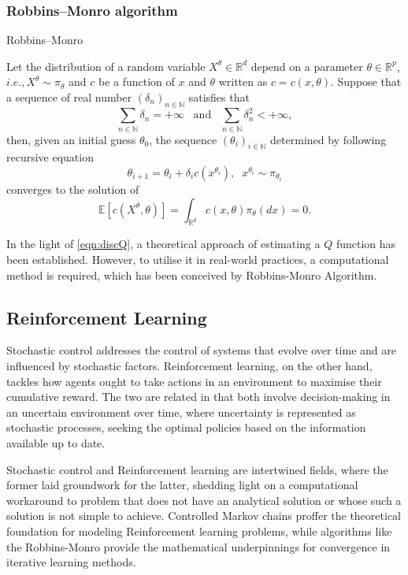 \documentclass[11pt,twoside]{article}
\numberwithin{Theorem}{section}
\numberwithin{Definition}{section}
\numberwithin{Lemma}{section}
\numberwithin{Algorithm}{section}
\numberwithin{equation}{section}
\begin{document}
\subsubsection{Robbins–Monro algorithm}
\begin{algorithm} [H] 
\caption{Robbins–Monro}\label{alg:RM}
    Let the distribution of a random variable $X^{\theta}\in\mathbb{R}^d$ depend on a parameter $\theta\in\mathbb{R}^p$, $i.e., X^{\theta}\sim\pi_{\theta}$ and $c$ be a function of $x$ and $\theta$ written as $c=c(x,\theta)$. Suppose that a sequence of real number $(\delta_n)_{n\in\mathbb{N}}$ satisfies that
\begin{equation}\label{eqn:req}
\sum_{n\in\mathbb{N}}\delta_n=+\infty\;\;\;\text{and}\;\;\;\sum_{n\in\mathbb{N}}\delta_n^2<+\infty,
\end{equation}
then, given an initial guess $\theta_0$, the sequence $(\theta_i)_{i\in\mathbb{N}}$ determined by following recursive equation
$$\theta_{i+1}=\theta_{i}+\delta_i c(x^{\theta_i}), \;\;x^{\theta_i}\sim\pi_{\theta_i}$$
converges to the solution of 
$$\mathbb{E}\left[c(X^{\theta},\theta)\right]=\int_{\mathbb{R}^d}c(x,\theta)\pi_{\theta}(dx)=0.$$
\end{algorithm}
In the light of \ref{eqn:discQ}, a theoretical approach of estimating a $Q$ function has been established. However, to utilise it in real-world practices, a computational method is required, which has been conceived by Robbins-Monro Algorithm.\cite{RM}
\clearpage

\subsection{Reinforcement Learning}
Stochastic control addresses the control of systems that evolve over time and are influenced by stochastic factors. Reinforcement learning, on the other hand, tackles how agents ought to take actions in an environment to maximise their cumulative reward. The two are related in that both involve decision-making in an uncertain environment over time, where uncertainty is represented as stochastic processes, seeking the optimal policies based on the information available up to date.

Stochastic control and Reinforcement learning are intertwined fields, where the former laid groundwork for the latter, shedding light on a computational workaround to problem that does not have an analytical solution or whose such a solution is not simple to achieve. Controlled Markov chains proffer the theoretical foundation for modeling Reinforcement learning problems, while algorithms like the Robbins-Monro provide the mathematical underpinnings for convergence in iterative learning methods.
\end{document}
